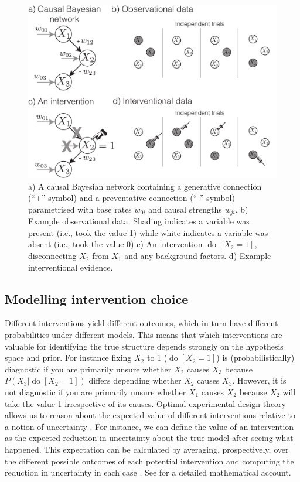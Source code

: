 \documentclass{cambridge7A}%
\DeclareMathOperator*{\Do}{do}
\begin{document}
\begin{figure}[t]
   \centering
   \includegraphics[width = .7\columnwidth]{CBNbw}
   \caption{a) A causal Bayesian network containing a generative connection (``+'' symbol) and a preventative connection (``-'' symbol) parametrised with base rates $w_{0i}$ and causal strengths $w_{ji}$.  b) Example observational data.  Shading indicates a variable was present (i.e., took the value 1) while white indicates a variable was absent (i.e., took the value 0) c) An intervention $\Do[X_2 = 1]$, disconnecting $X_2$ from $X_1$ and any background factors. d) Example interventional evidence.
   }
   \label{fig:CBN}
\end{figure}

\subsection{Modelling intervention choice}

Different interventions yield different outcomes, which in turn have different probabilities under different models.  This means that which interventions are valuable for identifying the true structure depends strongly on the hypothesis space and prior.  For instance fixing $X_2$ to 1 ($\Do[X_2\!=\!1]$) is (probabilistically) diagnostic if you are primarily unsure whether $X_2$ causes $X_3$ because $P(X_3|\Do[X_2\!=\!1])$ differs depending whether $X_2$ causes $X_3$.  However, it is not diagnostic if you are primarily unsure whether $X_1$ causes $X_2$ because $X_2$ will take the value 1 irrespective of its causes.  Optimal experimental design theory allows us to reason about the expected value of different interventions relative to a notion of uncertainty \citep{fedorov1972theory,raiffa1974applied}.  For instance, we can define the value of an intervention as the expected reduction in uncertainty about the true model after seeing what happened. This expectation can be calculated by averaging, prospectively, over the different possible outcomes of each potential intervention and computing the reduction in uncertainty in each case \citep[e.g.,][]{shannon1951prediction}. See \cite{bramley2017neurath} for a detailed mathematical account.
\end{document}
